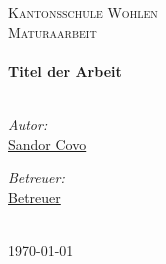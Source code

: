 \begin{titlepage}
\begin{center}

\textsc{\LARGE Kantonsschule Wohlen}\\[1.5cm] %
\textsc{\Large Maturaarbeit}\\[0.5cm] %

\HRule \\[0.4cm] %
{\huge \bfseries Titel der Arbeit}\\[0.4cm] %
\HRule \\[1.5cm] %
 
\begin{minipage}{0.4\textwidth}
\begin{flushleft} \large
\emph{Autor:}\\
\href{http://www.covo.ch}{Sandor Covo} %
\end{flushleft}
\end{minipage}
\begin{minipage}{0.4\textwidth}
\begin{flushright} \large
\emph{Betreuer:} \\
\href{http://www.jamessmith.com}{Betreuer} %
\end{flushright}
\end{minipage}\\[3cm]
 
{\large \today}\\[4cm] %
 
\vfill
\end{center}

\end{titlepage}
